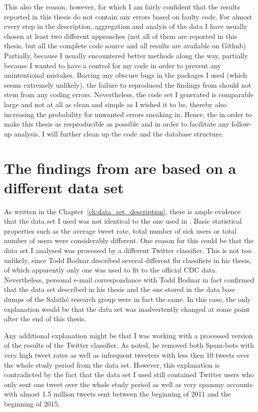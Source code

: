 \documentclass[11pt, a4paper,twoside]{report}\usepackage[]{graphicx}\usepackage[]{color}
\begin{document}
This also the reason, however, for which I am fairly confident that the results reported in this thesis do not contain any errors based on faulty code. For almost every step in the description, aggregation and analyis of the data I have usually chosen at least two different approaches (not all of them are reported in this thesis, but all the complete code source and all results are available on Github) Partially, because I usually encountered better methods along the way, partially because I wanted to have a control for my code in order to prevent any unintentional mistakes. Barring any obscure bugs in the packages I used (which seems extremely unlikely), the failure to reproduced the findings from \citep{bodnar_data_2015} should not stem from any coding errors. Nevertheless, the code set I generated is comparable large and not at all as clean and simple as I wished it to be, thereby also increasing the probability for unwanted errors sneaking in. Hence, the in order to make this thesis as resproducible as possible and in order to facilitate any follow-up analysis, I will further clean up the code and the database structure.

\section{The findings from \citep{bodnar_data_2015} are based on a different data set}
\label{sec:diff_data_set}
As written in the Chapter~\ref{ch:data_set_description}, there is ample evidence that the data set I used was not identical to the one used in \cite{bodnar_data_2015}. Basic statistical properties such as the average tweet rate, total number of sick users or total number of users were considerably different. One reason for this could be that the data set I analysed was processed by a different Twitter classifier. This is not too unlikely, since Todd Bodnar described several different flu classifiers in his thesis, of which apparently only one was used to fit to the official CDC data. Nevertheless, personal e-mail correspondance with Todd Bodnar in fact confirmed that the data set described in his thesis and the one stored in the data base dumps of the Salathé research group were in fact the same. In this case, the only explanation would be that the data set was inadvertently changed at some point after the end of this thesis.

Any additional explanation might be that I was working with a processed version of the results of the Twitter classifier. As \cite{Bodnar} noted, he removed both Spam-bots with very high tweet rates as well as infrequent tweeters with less then 10 tweets over the whole study period from the data set. However, this explanation is contradicted by the fact that the data set I used still contained Twitter users who only sent one tweet over the whole study period as well as very spammy accounts with almost 1.5 million tweets sent between the beginning of 2011 and the beginning of 2015.
\end{document}
